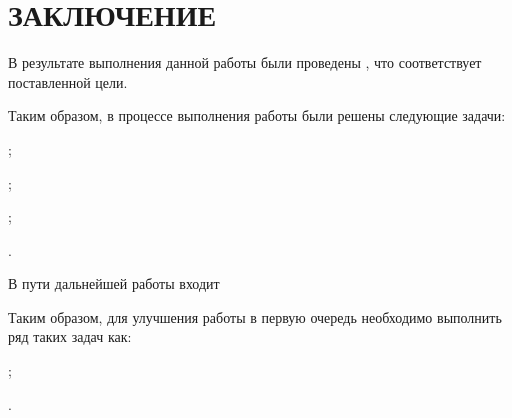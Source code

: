 \chapter*{\centering ЗАКЛЮЧЕНИЕ}

В результате выполнения данной работы были проведены
,
что соответствует поставленной цели.

Таким образом, в процессе выполнения работы были решены следующие задачи:
\begin{itemizePaper}
    \item {};
    \item {};
    \item {};
    \item {}.
\end{itemizePaper}

В пути дальнейшей работы входит

Таким образом, для улучшения работы в первую очередь необходимо выполнить ряд таких задач как:
\begin{itemizePaper}
    \item {};
    \item {}.
\end{itemizePaper}

